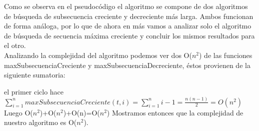 Como se observa en el pseudocódigo el algoritmo se compone de dos algoritmos de búsqueda de subsecuencia creciente y decreciente más larga. Ambos funcionan de forma análoga, por lo que de ahora en más vamos a analizar solo el algoritmo de búsqueda de secuencia máxima creciente y concluir los mismos resultados para el otro.\\
Analizando la complejidad del algoritmo podemos ver dos O($n^{2}$) de las funciones maxSubsecuenciaCreciente y maxSubsecuenciaDecreciente, éstos provienen de la siguiente sumatoria:

el primer ciclo hace\\
$\displaystyle\sum_{i=1}^n maxSubsecuenciaCreciente(t, i) = \sum_{i=1}^{n} i-1  = \frac{n(n-1)}{2} = O(n^{2})$
Luego O($n^{2}$)+O($n^{2}$)+O(n)=O($n^{2}$)              
Mostramos entonces que la complejidad de nuestro algoritmo es O($n^{2}$).
